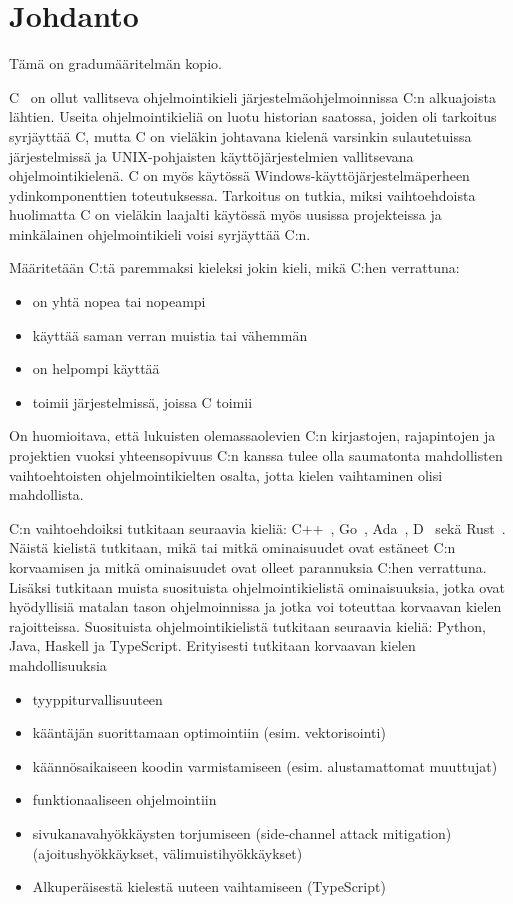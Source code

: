 \section{Johdanto} 

Tämä on gradumääritelmän kopio.

C~\citep{C11} on ollut vallitseva ohjelmointikieli järjestelmäohjelmoinnissa C:n
alkuajoista lähtien. Useita ohjelmointikieliä on luotu historian saatossa,
joiden oli tarkoitus syrjäyttää C, mutta C on vieläkin johtavana kielenä
varsinkin sulautetuissa järjestelmissä ja UNIX-pohjaisten käyttöjärjestelmien
vallitsevana ohjelmointikielenä. C on myös käytössä
Windows-käyttöjärjestelmäperheen ydinkomponenttien toteutuksessa. Tarkoitus on
tutkia, miksi vaihtoehdoista huolimatta C on vieläkin laajalti käytössä myös
uusissa projekteissa ja minkälainen ohjelmointikieli voisi syrjäyttää C:n.

Määritetään C:tä paremmaksi kieleksi jokin kieli, mikä C:hen verrattuna:

\begin{itemize}
    \item on yhtä nopea tai nopeampi
    \item käyttää saman verran muistia tai vähemmän
    \item on helpompi käyttää
    \item toimii järjestelmissä, joissa C toimii
\end{itemize}

On huomioitava, että lukuisten olemassaolevien C:n kirjastojen, rajapintojen ja
projektien vuoksi yhteensopivuus C:n kanssa tulee olla saumatonta mahdollisten
vaihtoehtoisten ohjelmointikielten osalta, jotta kielen vaihtaminen olisi
mahdollista.

C:n vaihtoehdoiksi tutkitaan seuraavia kieliä: C++~\citep{CPP14},
Go~\citep{golang}, Ada~\citep{ADA12}, D~\citep{D} sekä Rust~\citep{rust}.
Näistä kielistä tutkitaan, mikä tai mitkä ominaisuudet ovat estäneet C:n
korvaamisen ja mitkä ominaisuudet ovat olleet parannuksia C:hen verrattuna.
Lisäksi tutkitaan muista suosituista ohjelmointikielistä ominaisuuksia, jotka
ovat hyödyllisiä matalan tason ohjelmoinnissa ja jotka voi toteuttaa korvaavan
kielen rajoitteissa. Suosituista ohjelmointikielistä tutkitaan seuraavia
kieliä: Python, Java, Haskell ja TypeScript. Erityisesti tutkitaan korvaavan
kielen mahdollisuuksia

\begin{itemize}
    \item tyyppiturvallisuuteen
    \item kääntäjän suorittamaan optimointiin
        (esim. vektorisointi)
    \item käännösaikaiseen koodin varmistamiseen
        (esim. alustamattomat muuttujat)
    \item funktionaaliseen ohjelmointiin
    \item sivukanavahyökkäysten torjumiseen (side-channel attack mitigation)
        (ajoitushyökkäykset, välimuistihyökkäykset)
    \item Alkuperäisestä kielestä uuteen vaihtamiseen (TypeScript)
\end{itemize}


